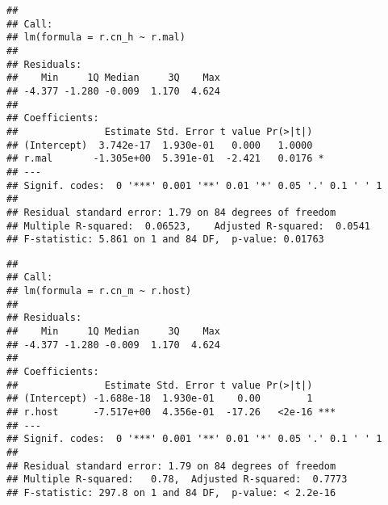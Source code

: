 \documentclass[]{article}
\newenvironment{Shaded}{\begin{snugshade}}{\end{snugshade}}
\newcommand{\KeywordTok}[1]{\textcolor[rgb]{0.13,0.29,0.53}{\textbf{#1}}}
\newcommand{\DataTypeTok}[1]{\textcolor[rgb]{0.13,0.29,0.53}{#1}}
\newcommand{\DecValTok}[1]{\textcolor[rgb]{0.00,0.00,0.81}{#1}}
\newcommand{\FloatTok}[1]{\textcolor[rgb]{0.00,0.00,0.81}{#1}}
\newcommand{\StringTok}[1]{\textcolor[rgb]{0.31,0.60,0.02}{#1}}
\newcommand{\CommentTok}[1]{\textcolor[rgb]{0.56,0.35,0.01}{\textit{#1}}}
\newcommand{\OperatorTok}[1]{\textcolor[rgb]{0.81,0.36,0.00}{\textbf{#1}}}
\newcommand{\NormalTok}[1]{#1}
\begin{document}
\begin{verbatim}
## 
## Call:
## lm(formula = r.cn_h ~ r.mal)
## 
## Residuals:
##    Min     1Q Median     3Q    Max 
## -4.377 -1.280 -0.009  1.170  4.624 
## 
## Coefficients:
##               Estimate Std. Error t value Pr(>|t|)  
## (Intercept)  3.742e-17  1.930e-01   0.000   1.0000  
## r.mal       -1.305e+00  5.391e-01  -2.421   0.0176 *
## ---
## Signif. codes:  0 '***' 0.001 '**' 0.01 '*' 0.05 '.' 0.1 ' ' 1
## 
## Residual standard error: 1.79 on 84 degrees of freedom
## Multiple R-squared:  0.06523,    Adjusted R-squared:  0.0541 
## F-statistic: 5.861 on 1 and 84 DF,  p-value: 0.01763
\end{verbatim}

\begin{Shaded}
\end{Shaded}

\begin{verbatim}
## 
## Call:
## lm(formula = r.cn_m ~ r.host)
## 
## Residuals:
##    Min     1Q Median     3Q    Max 
## -4.377 -1.280 -0.009  1.170  4.624 
## 
## Coefficients:
##               Estimate Std. Error t value Pr(>|t|)    
## (Intercept) -1.688e-18  1.930e-01    0.00        1    
## r.host      -7.517e+00  4.356e-01  -17.26   <2e-16 ***
## ---
## Signif. codes:  0 '***' 0.001 '**' 0.01 '*' 0.05 '.' 0.1 ' ' 1
## 
## Residual standard error: 1.79 on 84 degrees of freedom
## Multiple R-squared:   0.78,  Adjusted R-squared:  0.7773 
## F-statistic: 297.8 on 1 and 84 DF,  p-value: < 2.2e-16
\end{verbatim}

\begin{Shaded}
\end{Shaded}
\end{document}
